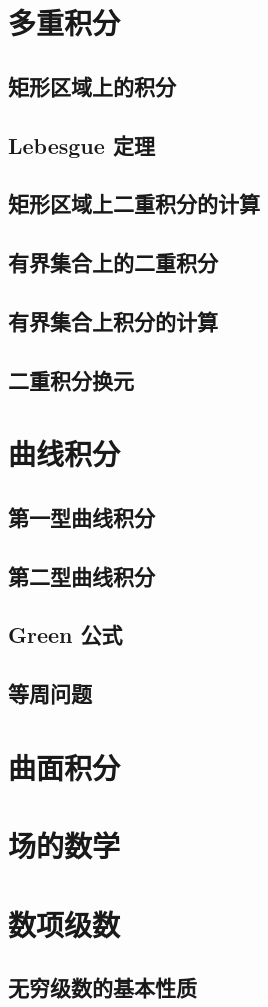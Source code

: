 \documentclass[a4paper, 11pt]{ctexbook}
\begin{document}
        \chapter{多重积分}
            \section{矩形区域上的积分}
            \section{Lebesgue 定理}
                
            \section{矩形区域上二重积分的计算}
                
            \section{有界集合上的二重积分}
                
            \section{有界集合上积分的计算}
                
            \section{二重积分换元}
                
        \chapter{曲线积分}
            \section{第一型曲线积分}
                
            \section{第二型曲线积分}
                
            \section{Green 公式}
                
            \section{等周问题}
        \chapter{曲面积分}
        \chapter{场的数学}
        \chapter{数项级数}
            \section{无穷级数的基本性质}
                
\end{document}
